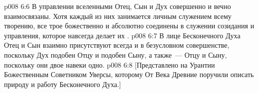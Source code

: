 \vs p008 6:6 \pc В управлении вселенными Отец, Сын и Дух совершенно и вечно взаимосвязаны. Хотя каждый из них занимается личным служением всему творению, все трое божественно и абсолютно соединены в служении созидания и управления, которое навсегда делает их .
\vs p008 6:7 В лице Бесконечного Духа Отец и Сын взаимно присутствуют всегда и в безусловном совершенстве, поскольку Дух подобен Отцу и подобен Сыну, а также~--- Отцу и Сыну, поскольку они двое навеки одно.
\vsetoff
\vs p008 6:8 [Представлено на Урантии Божественным Советником Уверсы, которому От Века Древние поручили описать природу и работу Бесконечного Духа.]
\quizlink
